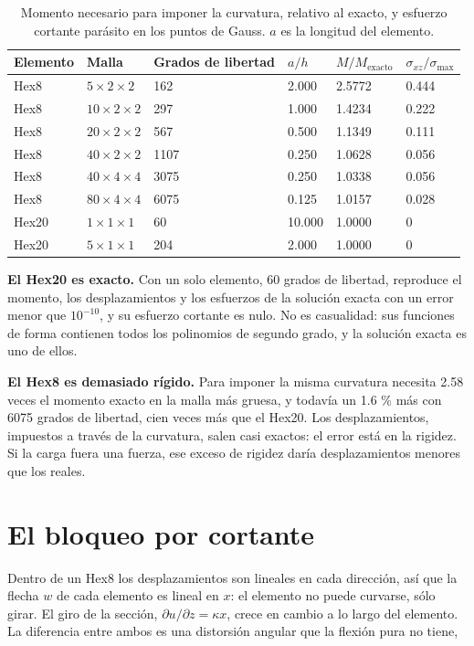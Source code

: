\documentclass[11pt,oneside]{report}
\begin{document}
\begin{table}[h]
\centering
\caption{Momento necesario para imponer la curvatura, relativo al exacto, y esfuerzo cortante parásito en los puntos de Gauss. $a$ es la longitud del elemento.}
\begin{tabularx}{\textwidth}{YYYYYY}
\hline
\textbf{Elemento} & \textbf{Malla} & \textbf{Grados de libertad} & \textbf{$a/h$} & \textbf{$M/M_{\mathrm{exacto}}$} & \textbf{$\sigma_{xz}/\sigma_{\max}$} \\
\hline
Hex8 & $5 \times 2 \times 2$ & 162 & 2.000 & 2.5772 & 0.444 \\
Hex8 & $10 \times 2 \times 2$ & 297 & 1.000 & 1.4234 & 0.222 \\
Hex8 & $20 \times 2 \times 2$ & 567 & 0.500 & 1.1349 & 0.111 \\
Hex8 & $40 \times 2 \times 2$ & 1107 & 0.250 & 1.0628 & 0.056 \\
Hex8 & $40 \times 4 \times 4$ & 3075 & 0.250 & 1.0338 & 0.056 \\
Hex8 & $80 \times 4 \times 4$ & 6075 & 0.125 & 1.0157 & 0.028 \\
Hex20 & $1 \times 1 \times 1$ & 60 & 10.000 & 1.0000 & 0 \\
Hex20 & $5 \times 1 \times 1$ & 204 & 2.000 & 1.0000 & 0 \\
\hline
\end{tabularx}
\end{table}
\textbf{El Hex20 es exacto.} Con un solo elemento, 60 grados de libertad, reproduce el momento, los desplazamientos y los esfuerzos de la solución exacta con un error menor que $10^{-10}$, y su esfuerzo cortante es nulo. No es casualidad: sus funciones de forma contienen todos los polinomios de segundo grado, y la solución exacta es uno de ellos.

\textbf{El Hex8 es demasiado rígido.} Para imponer la misma curvatura necesita 2.58 veces el momento exacto en la malla más gruesa, y todavía un 1.6 \% más con 6075 grados de libertad, cien veces más que el Hex20. Los desplazamientos, impuestos a través de la curvatura, salen casi exactos: el error está en la rigidez. Si la carga fuera una fuerza, ese exceso de rigidez daría desplazamientos menores que los reales.

\section{El bloqueo por cortante}

Dentro de un Hex8 los desplazamientos son lineales en cada dirección, así que la flecha $w$ de cada elemento es lineal en $x$: el elemento no puede curvarse, sólo girar. El giro de la sección, $\partial u/\partial z = \kappa x$, crece en cambio a lo largo del elemento. La diferencia entre ambos es una distorsión angular que la flexión pura no tiene,
\end{document}
